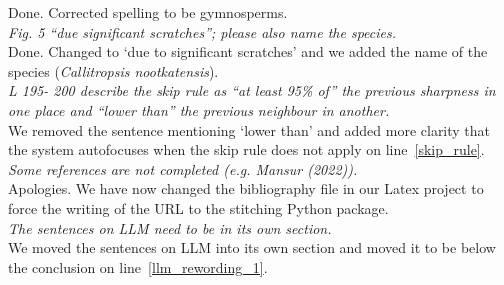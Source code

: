 \documentclass[12pt,a4paper]{article}
\newcommand{\lr}[1]{line~\ref{#1}}
\begin{document}
Done. Corrected spelling to be gymnosperms. \\

\emph{Fig. 5 ``due significant scratches”; please also name the species.} \\

Done. Changed to `due to significant scratches' and we added the name of the species (\emph{Callitropsis nootkatensis}). \\ %

\emph{L 195- 200 describe the skip rule as “at least 95\% of” the previous sharpness in one place and “lower than” the previous neighbour in another.} \\

We removed the sentence mentioning `lower than' and added more clarity that the system autofocuses when the skip rule does not apply on \lr{skip_rule}. \\

\emph{Some references are not completed (e.g. Mansur (2022)).} \\ 

Apologies. We have now changed the bibliography file in our Latex project to force the writing of the URL to the stitching Python package. \\

\emph{The sentences on LLM need to be in its own section.} \\

We moved the sentences on LLM into its own section and moved it to be below the conclusion on \lr{llm_rewording_1}. \\
\end{document}
